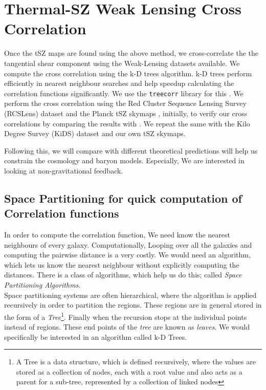 \chapter{Thermal-SZ Weak Lensing Cross Correlation}
\label{cross_correlation}
Once the tSZ maps are found using the above method, we cross-correlate the the tangential
shear component using the Weak-Lensing datasets available.
We compute the cross correlation using
the k-D trees algorithm. k-D trees perform efficiently in nearest neighbour searches and help
speedup calculating the correlation functions significantly. We use the \texttt{treecorr} library
for this \cite{treecorr}. We perform the cross correlation
using the  Red Cluster Sequence Lensing Survey (RCSLens) dataset \cite{rcslens}
and the Planck tSZ skymaps \cite{plancksz}, initially, to verify our cross correlations by
comparing the results with \cite{tszrcscross}.
We repeat the same with the Kilo Degree Survey (KiDS) dataset and
our own tSZ skymaps. 

Following this, we will compare with different theoretical predictions will help us
constrain the cosmology and baryon models. Especially, We are interested in looking at
non-gravitational feedback.

\section{Space Partitioning for quick computation of Correlation functions}
In order to compute the correlation function, We need know the nearest neighbours of every galaxy. Computationally, Looping over all the
galaxies and computing the pairwise distance is a very costly. We would need an algorithm, which lets us know the nearest neighbour without
explicitly computing the distances. There is a class of algorithms, which help us do this; called \emph{Space Partitioning Algorithms}.
\\
Space partitioning systems are often hierarchical, where the algorithm is applied recursively in order to partition the regions. These regions are in general
stored in the form of a \emph{Tree}\footnote{A Tree is a data structure, which is defined recursively, where the values are stored as a collection of nodes, each
  with a root value and also acts as a parent for a sub-tree, represented by a collection of linked nodes}. Finally when the recursion stops at the individual
points instead of regions. These end points of the \emph{tree} are known as \emph{leaves}.
We would specifically be interested in an algorithm called k-D Trees. \\

